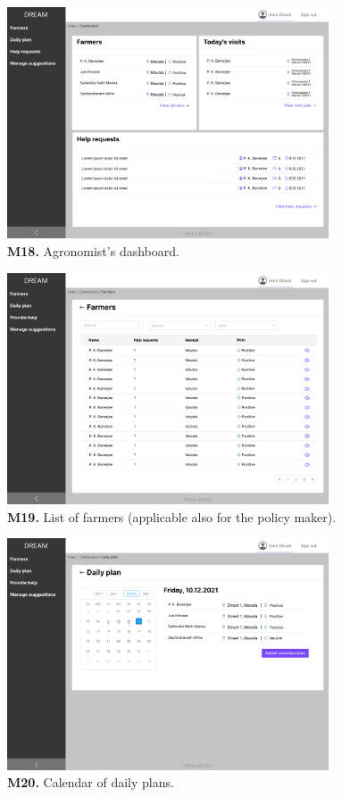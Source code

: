 \begin{figure}[H]
    \centering
    \includegraphics[width=0.85\textwidth]{mockups/Agronomist_Dashboard.png}
    \caption{\textbf{M18.} Agronomist's dashboard.}
\end{figure}

\begin{figure}[H]
    \centering
    \includegraphics[width=0.85\textwidth]{mockups/Agronomist_Dashboard_Farmers.png}
    \caption{\textbf{M19.} List of farmers (applicable also for the policy maker).}
\end{figure}

\begin{figure}[H]
    \centering
    \includegraphics[width=0.85\textwidth]{mockups/Agronomist_Dashboard_Visit plan.png}
    \caption{\textbf{M20.} Calendar of daily plans.}
\end{figure}

